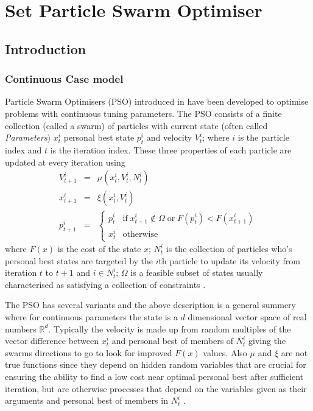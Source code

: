 \documentclass[a4paper,oneside,english]{book}
\numberwithin{equation}{section}
\numberwithin{figure}{section}
\begin{document}
	\chapter{Set Particle Swarm Optimiser}
\section{Introduction}
\subsection{Continuous Case model}
Particle Swarm Optimisers (PSO) introduced in \cite{KE-pso} have been developed to optimise problems with continuous tuning parameters. The PSO consists of a finite collection (called a swarm) of particles with current state (often called \textit{Parameters}) $x_t^i$ personal best state $p_t^i$ and velocity $V_t^i$; where $i$ is the particle index and $t$ is the iteration index. These three properties of each particle are updated at every iteration using 
\begin{align}
V_{t+1}^i&=&\mu \left(x_t^i,V_t^i,N_t^i\right)\\
x_{t+1}^i&=&\xi \left(x_t^i,V_t^i\right)\\
p_{t+1}^i&=&\left\lbrace \begin{array}{cc}
p_t^i& \mathrm{if}\; x_{t+1}^i\notin \varOmega \;\mathrm{or}\; F(p_t^i)<F(x_{t+1}^i)  \\ 
x_t^i&\mathrm{otherwise} 
\end{array}\right. 
\end{align} 
where $F(x)$ is the cost of the state $x$; $N_t^i$ is the  collection of particles who's  personal best states are targeted by the $i$th particle to update its velocity from iteration $t$ to $t+1$ and  $ i \in N_t^i $; $\varOmega$ is a feasible  subset of states usually characterised as satisfying a collection of constraints . 

The PSO has several variants and the above description is a general summery where for continuous parameters the state is a $d$ dimensional vector space of real numbers $\mathbb{R}^d$. Typically the velocity is made up from random multiples of the vector difference between $x_t^i$ and personal best of members of $N_t^i$ giving the swarms directions to go to look for improved $F(x)$ values. Also $\mu$ and $\xi$ are not true functions since they depend on hidden random variables that are crucial for ensuring the ability to find a low cost near optimal personal best after sufficient iteration, but are otherwise processes that depend on the variables given as their arguments and personal best of members in $N_t^i$ .
 
\end{document}
